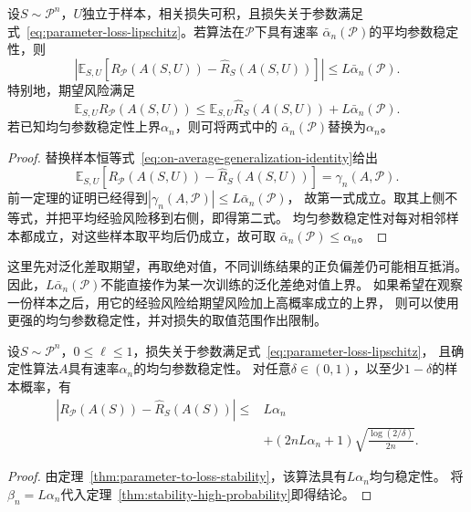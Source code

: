 \begin{theorem}[参数稳定性与期望泛化差]
\label{thm:parameter-expected-generalization}
设$S\sim\mathcal P^n$，$U$独立于样本，相关损失可积，且损失关于参数满足
式~\eqref{eq:parameter-loss-lipschitz}。若算法在$\mathcal P$下具有速率
$\bar\alpha_n(\mathcal P)$的平均参数稳定性，则
\begin{equation}
 \left|\mathbb E_{S,U}
 [R_{\mathcal P}(A(S,U))-\hat R_S(A(S,U))]\right|
 \leq L\bar\alpha_n(\mathcal P).
 \label{eq:parameter-generalization}
\end{equation}
特别地，期望风险满足
\[
 \mathbb E_{S,U}R_{\mathcal P}(A(S,U))
 \leq\mathbb E_{S,U}\hat R_S(A(S,U))+L\bar\alpha_n(\mathcal P).
\]
若已知均匀参数稳定性上界$\alpha_n$，则可将两式中的
$\bar\alpha_n(\mathcal P)$替换为$\alpha_n$。
\end{theorem}
\begin{proof}
替换样本恒等式~\eqref{eq:on-average-generalization-identity}给出
\[
 \mathbb E_{S,U}[R_{\mathcal P}(A(S,U))-\hat R_S(A(S,U))]
 =\gamma_n(A,\mathcal P).
\]
前一定理的证明已经得到$|\gamma_n(A,\mathcal P)|\leq L\bar\alpha_n(\mathcal P)$，
故第一式成立。取其上侧不等式，并把平均经验风险移到右侧，即得第二式。
均匀参数稳定性对每对相邻样本都成立，对这些样本取平均后仍成立，故可取
$\bar\alpha_n(\mathcal P)\leq\alpha_n$。
\end{proof}

这里先对泛化差取期望，再取绝对值，不同训练结果的正负偏差仍可能相互抵消。
因此，$L\bar\alpha_n(\mathcal P)$不能直接作为某一次训练的泛化差绝对值上界。
如果希望在观察一份样本之后，用它的经验风险给期望风险加上高概率成立的上界，
则可以使用更强的均匀参数稳定性，并对损失的取值范围作出限制。

\begin{theorem}[均匀参数稳定性的高概率泛化界]
\label{thm:parameter-high-probability}
设$S\sim\mathcal P^n$，$0\leq\ell\leq1$，损失关于参数满足式~\eqref{eq:parameter-loss-lipschitz}，
且确定性算法$A$具有速率$\alpha_n$的均匀参数稳定性。
对任意$\delta\in(0,1)$，以至少$1-\delta$的样本概率，有
\begin{align*}
 |R_{\mathcal P}(A(S))-\hat R_S(A(S))|
 \leq{}&L\alpha_n\\
 &+(2nL\alpha_n+1)\sqrt{\frac{\log(2/\delta)}{2n}}.
\end{align*}
\end{theorem}
\begin{proof}
由定理~\ref{thm:parameter-to-loss-stability}，该算法具有$L\alpha_n$均匀稳定性。
将$\beta_n=L\alpha_n$代入定理~\ref{thm:stability-high-probability}即得结论。
\end{proof}

